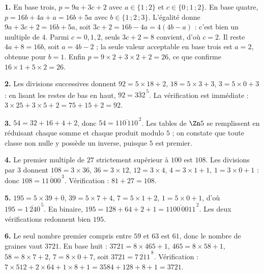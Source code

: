 \begin{corrige}[annales]
\textbf{1.} En base trois, $p = 9a+3c+2$ avec $a \in \{1\,;2\}$ et
$c \in \{0\,;1\,;2\}$. En base quatre, $p = 16b+4a+a = 16b+5a$ avec
$b \in \{1\,;2\,;3\}$. L'égalité donne $9a+3c+2 = 16b+5a$, soit
$3c+2 = 16b-4a = 4(4b-a)$ : c'est bien un multiple de $4$. Parmi
$c = 0,1,2$, seuls $3c+2 = 8$ convient, d'où $c = 2$. Il reste
$4a+8 = 16b$, soit $a = 4b-2$ ; la seule valeur acceptable en base trois est
$a = 2$, obtenue pour $b = 1$. Enfin $p = 9\times2+3\times2+2 = 26$, ce que
confirme $16\times1+5\times2 = 26$.

\textbf{2.} Les divisions successives donnent $92 = 5\times18+2$,
$18 = 5\times3+3$, $3 = 5\times0+3$ : en lisant les restes de bas en haut,
$92 = \overline{332}^{\,5}$. La vérification est immédiate :
$3\times25+3\times5+2 = 75+15+2 = 92$.

\textbf{3.} $54 = 32+16+4+2$, donc $54 = \overline{110\,110}^{\,2}$. Les
tables de $\Zn 5$ se remplissent en réduisant chaque somme et chaque produit
modulo $5$ ; on constate que toute classe non nulle y possède un inverse,
puisque $5$ est premier.

\textbf{4.} Le premier multiple de $27$ strictement supérieur à $100$ est
$108$. Les divisions par $3$ donnent $108 = 3\times36$, $36 = 3\times12$,
$12 = 3\times4$, $4 = 3\times1+1$, $1 = 3\times0+1$ : donc
$108 = \overline{11\,000}^{\,3}$. Vérification : $81+27 = 108$.

\textbf{5.} $195 = 5\times39+0$, $39 = 5\times7+4$, $7 = 5\times1+2$,
$1 = 5\times0+1$, d'où $195 = \overline{1\,240}^{\,5}$. En binaire,
$195 = 128+64+2+1 = \overline{1100\,0011}^{\,2}$. Les deux vérifications
redonnent bien $195$.

\textbf{6.} Le seul nombre premier compris entre $59$ et $63$ est $61$, donc
le nombre de graines vaut $3721$. En base huit : $3721 = 8\times465+1$,
$465 = 8\times58+1$, $58 = 8\times7+2$, $7 = 8\times0+7$, soit
$3721 = \overline{7\,211}^{\,8}$. Vérification :
$7\times512+2\times64+1\times8+1 = 3584+128+8+1 = 3721$.
\end{corrige}

